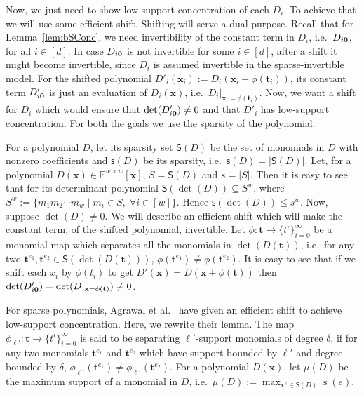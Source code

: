 \documentclass[final,oneeqnum, onethmnum, onefignum]{siamltex1213}
\newcommand{\F}{\mathbb F}
\newcommand{\abs}[1]{\lvert #1 \rvert}
\newcommand{\Dx}{D(\mathbf{x})}
\DeclareMathOperator{\suppo}{s} %
\renewcommand{\sp}{\mathsf{s}} %
\newcommand{\Sp}{\mathsf{S}}
\begin{document}
Now, we just need to show low-support concentration 
of each $D_i$. 
To achieve that we will use some efficient shift.
Shifting will serve a dual purpose. 
Recall that for Lemma~\ref{lem:bSConc}, we need
invertibility of the constant term in $D_i$, i.e.\ $D_{i\bf{0}}$, 
for all $i \in [d]$.
In case $D_{i \bf{0}}$ is not invertible for some $i \in [d]$, 
after a shift it might become invertible, 
since $D_i$ is assumed invertible in the sparse-invertible model. 
For the shifted polynomial $D'_i(\mathbf{x}_i) := D_i(\mathbf{x}_i + \phi(\mathbf{t}_i))$,
its constant term $D'_{i\bf{0}}$ is just an evaluation of $D_i(\mathbf{x})$, 
i.e.\ $D_i|_{\mathbf{x}_i = \phi(\mathbf{t}_i)}$.
Now, we want a shift for $D_i$ which would ensure that 
$\det(D'_{i{\bf 0}}) \neq 0$ and that $D'_i$ has low-support concentration. 
For both the goals we use the sparsity of the polynomial. 

For a polynomial $D$, let its sparsity set 
$\Sp(D)$ be the set of monomials in $D$
with nonzero coefficients 
and $\sp(D)$ be its
sparsity, i.e.\ $\sp(D) = \abs{\Sp(D)}$.
Let,
for a polynomial $D(\mathbf{x}) \in \F^{w \times w}[\mathbf{x}]$,
$S = \Sp(D)$ and $s = \abs{S}$. 
Then it is easy to see that 
for its determinant polynomial 
$\Sp(\det(D)) \subseteq S^w$,
where $S^w := \{ m_1 m_2 \dotsm m_w \mid m_i \in S, \; \forall i \in [w]   \}$.
Hence $\sp(\det(D)) \leq s^w$.
Now, suppose $\det(D) \neq 0$. 
We will describe an efficient shift which will make the
constant term, of the shifted polynomial, invertible. 
Let $\phi \colon \mathbf{t} \to \{t^i\}_{i=0}^{\infty}$ be a monomial map
which separates all the monomials in $\det(D(\mathbf{t}))$,
i.e.\
for any two $\mathbf{t}^{e_1},{\mathbf{t}}^{e_2} \in \Sp(\det(D(\mathbf{t})))$,
$\phi(\mathbf{t}^{e_1}) \neq \phi(\mathbf{t}^{e_2})$. 
It is easy to see that if we shift each $x_i$ by $\phi(t_i)$
to get $D'(\mathbf{x}) = D(\mathbf{x} + \phi(\mathbf{t}))$ then 
$\det(D'_{i{\bf 0}}) = \det(D|_{\mathbf{x} = \phi(\mathbf{t})}) \neq 0$.

For sparse polynomials, Agrawal et al.\ \cite[Lemma 16]{ASS13} have 
given an efficient shift to achieve low-support concentration. 
Here, we rewrite their lemma. %
The map $\phi_{\ell'} \colon \mathbf{t} \to \{t^i\}_{i=0}^{\infty}$ is 
said to be separating $\ell'$-support monomials of degree $\delta$,
if for any two monomials $\mathbf{t}^{e_1}$ and $\mathbf{t}^{e_2}$ which have
support bounded by $\ell'$ and degree bounded by $\delta$, 
$\phi_{\ell'}(\mathbf{t}^{e_1}) \neq \phi_{\ell'}(\mathbf{t}^{e_2})$. 
For a polynomial $\Dx$, let $\mu(D)$ be the maximum support 
of a monomial in $D$, i.e.\ $\mu(D) := \displaystyle\max_{\mathbf{x}^e \in \Sp(D)} \suppo(e)$.
\end{document}
